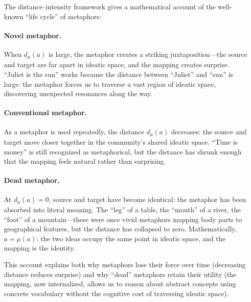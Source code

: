 \begin{interpretation}
\label{interp:metaphor-lifecycle}
The distance--intensity framework gives a mathematical account of the well-known
``life cycle'' of metaphors:

\paragraph{Novel metaphor.} When $d_\mu(a)$ is large, the metaphor creates a
striking juxtaposition---the source and target are far apart in ideatic space,
and the mapping creates surprise.  ``Juliet is the sun'' works because the
distance between ``Juliet'' and ``sun'' is large: the metaphor forces us to
traverse a vast region of ideatic space, discovering unexpected resonances
along the way.

\paragraph{Conventional metaphor.} As a metaphor is used repeatedly, the
distance $d_\mu(a)$ decreases: the source and target move closer together in
the community's shared ideatic space.  ``Time is money'' is still recognized
as metaphorical, but the distance has shrunk enough that the mapping feels
natural rather than surprising.

\paragraph{Dead metaphor.} At $d_\mu(a) = 0$, source and target have become
identical: the metaphor has been absorbed into literal meaning.  The ``leg''
of a table, the ``mouth'' of a river, the ``foot'' of a mountain---these were
once vivid metaphors mapping body parts to geographical features, but the
distance has collapsed to zero.  Mathematically, $a = \mu(a)$:
the two ideas occupy the same point in ideatic space, and the mapping is the
identity.

This account explains both why metaphors lose their force over time (decreasing
distance reduces surprise) and why ``dead'' metaphors retain their utility
(the mapping, now internalized, allows us to reason about abstract concepts
using concrete vocabulary without the cognitive cost of traversing ideatic space).
\end{interpretation}


